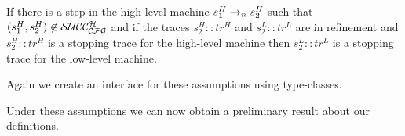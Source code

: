 \begin{definition}
\label{as_implies_cs}
If there is a step in the high-level machine $s^H_1\to_ns^H_2$
such that $(s^H_1,s^H_2) \not \in \mathcal{SUCC_\mathcal{CFG}^{H}}$ and if the traces $s^H_2
:: tr^H$ and $s^L_2 :: tr^L$ are in refinement and $s^H_2 :: tr^H$ is
a stopping trace for the high-level machine then $s^L_2 :: tr^L$ is a
stopping trace for the low-level machine.
\end{definition}

Again we create an interface for these assumptions using type-classes.









Under these assumptions we can now obtain a preliminary result about
our \CFI definitions.

